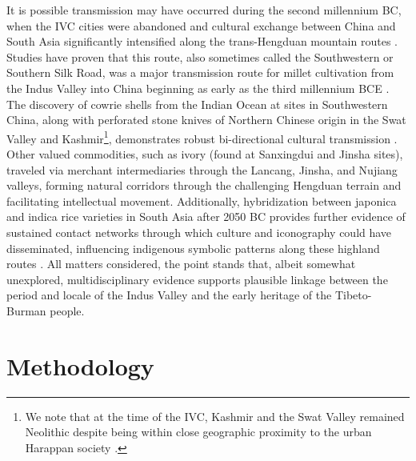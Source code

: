 \documentclass[11pt,a4paper,oneside]{report}
\begin{document}
It is possible transmission may have occurred during the second millennium BC, when the IVC cities were abandoned and cultural exchange between China and South Asia significantly intensified along the trans-Hengduan mountain routes \cite{ma_understanding_2023}. Studies have proven that this route, also sometimes called the Southwestern or Southern Silk Road, was a major transmission route for millet cultivation from the Indus Valley into China beginning as early as the third millennium BCE \cite{jacques_linguistic_2024}. The discovery of cowrie shells from the Indian Ocean at sites in Southwestern China, along with perforated stone knives of Northern Chinese origin in the Swat Valley and Kashmir\footnote{We note that at the time of the IVC, Kashmir and the Swat Valley remained Neolithic despite being within close geographic proximity to the urban Harappan society \cite{betts_northern_2019}.}, demonstrates robust bi-directional cultural transmission \cite{gao_new_2021}. Other valued commodities, such as ivory (found at Sanxingdui and Jinsha sites), traveled via merchant intermediaries through the Lancang, Jinsha, and Nujiang valleys, forming natural corridors through the challenging Hengduan terrain and facilitating intellectual movement. Additionally, hybridization between japonica and indica rice varieties in South Asia after 2050 BC provides further evidence of sustained contact networks through which culture and iconography could have disseminated, influencing indigenous symbolic patterns along these highland routes \cite{fuller_consilience_2010}. All matters considered, the point stands that, albeit somewhat unexplored, multidisciplinary evidence supports plausible linkage between the period and locale of the Indus Valley and the early heritage of the Tibeto-Burman people.

\chapter{Methodology}
\label{material-and-methods}
\end{document}
